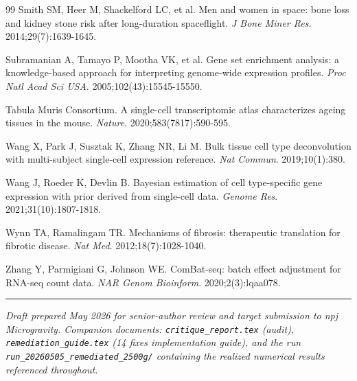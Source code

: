 \documentclass[11pt]{article}
\newcommand{\code}[1]{\texttt{#1}}
\begin{document}
\begin{thebibliography}{99}
 Smith SM, Heer M, Shackelford LC, et al. Men and women in space: bone loss and kidney stone risk after long-duration spaceflight. \emph{J Bone Miner Res}. 2014;29(7):1639-1645.

 Subramanian A, Tamayo P, Mootha VK, et al. Gene set enrichment analysis: a knowledge-based approach for interpreting genome-wide expression profiles. \emph{Proc Natl Acad Sci USA}. 2005;102(43):15545-15550.

 Tabula Muris Consortium. A single-cell transcriptomic atlas characterizes ageing tissues in the mouse. \emph{Nature}. 2020;583(7817):590-595.

 Wang X, Park J, Susztak K, Zhang NR, Li M. Bulk tissue cell type deconvolution with multi-subject single-cell expression reference. \emph{Nat Commun}. 2019;10(1):380.

 Wang J, Roeder K, Devlin B. Bayesian estimation of cell type-specific gene expression with prior derived from single-cell data. \emph{Genome Res}. 2021;31(10):1807-1818.

 Wynn TA, Ramalingam TR. Mechanisms of fibrosis: therapeutic translation for fibrotic disease. \emph{Nat Med}. 2012;18(7):1028-1040.

 Zhang Y, Parmigiani G, Johnson WE. ComBat-seq: batch effect adjustment for RNA-seq count data. \emph{NAR Genom Bioinform}. 2020;2(3):lqaa078.

\end{thebibliography}

\vspace{1em}
\begin{center}
\rule{0.4\textwidth}{0.4pt}
\end{center}
\vspace{0.3em}
\noindent\textit{Draft prepared May 2026 for senior-author review and target submission to npj Microgravity. Companion documents: \code{critique\_report.tex} (audit), \code{remediation\_guide.tex} (14 fixes implementation guide), and the run \code{run\_20260505\_remediated\_2500g/} containing the realized numerical results referenced throughout.}
\end{document}

